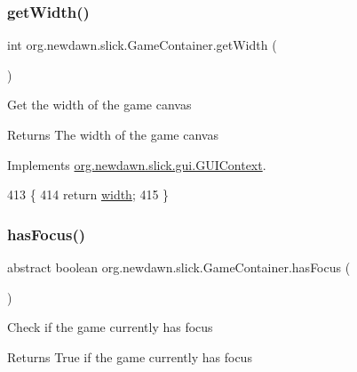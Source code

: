 \subsubsection{\texorpdfstring{get\+Width()}{getWidth()}}
{\footnotesize\ttfamily int org.\+newdawn.\+slick.\+Game\+Container.\+get\+Width (\begin{DoxyParamCaption}{ }\end{DoxyParamCaption})\hspace{0.3cm}{\ttfamily [inline]}}

Get the width of the game canvas

\begin{DoxyReturn}{Returns}
The width of the game canvas 
\end{DoxyReturn}


Implements \mbox{\hyperlink{interfaceorg_1_1newdawn_1_1slick_1_1gui_1_1_g_u_i_context_a013e06eaddd0d6872dc628ca171c6753}{org.\+newdawn.\+slick.\+gui.\+G\+U\+I\+Context}}.


\begin{DoxyCode}
413                           \{
414         \textcolor{keywordflow}{return} \mbox{\hyperlink{classorg_1_1newdawn_1_1slick_1_1_game_container_a8c65160202b9f5aafde3fcf03e6155c9}{width}};
415     \}
\end{DoxyCode}
\mbox{\label{classorg_1_1newdawn_1_1slick_1_1_game_container_a4fa0f77bdff52d66d2db55d8718b9867}} 
\subsubsection{\texorpdfstring{has\+Focus()}{hasFocus()}}
{\footnotesize\ttfamily abstract boolean org.\+newdawn.\+slick.\+Game\+Container.\+has\+Focus (\begin{DoxyParamCaption}{ }\end{DoxyParamCaption})\hspace{0.3cm}{\ttfamily [abstract]}}

Check if the game currently has focus

\begin{DoxyReturn}{Returns}
True if the game currently has focus 
\end{DoxyReturn}
\mbox{\label{classorg_1_1newdawn_1_1slick_1_1_game_container_a8cef7158ee723477c3435e791b21df66}} 
